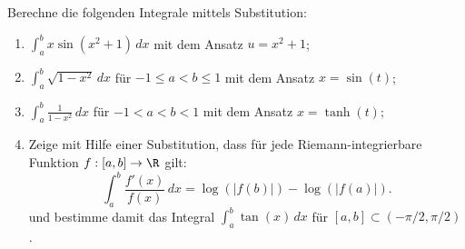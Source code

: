 \begin{prob}
Berechne die folgenden Integrale mittels Substitution:
\begin{enumerate}[label=(\alph*)]
\item $\int_a^b x\sin(x^2+1)\,dx$ mit dem Ansatz $u=x^2+1$;
\item $\int_a^b \sqrt{1-x^2}\,dx$ f\"ur $-1\leq a<b\leq1$ mit dem Ansatz $x=\sin(t)$;
\item $\int_a^b\frac{1}{1-x^2}\,dx$ f\"ur $-1<a<b<1$ mit dem Ansatz $x=\tanh(t)$;
\item Zeige mit Hilfe einer Substitution, dass für jede Riemann-integrierbare Funktion $f:[a,b]\to\R$ gilt:
$$
\int_a^b\frac{f'(x)}{f(x)}\,dx = \log(|f(b)|)- \log(|f(a)|).
$$
 und bestimme damit das Integral $\int_a^b\tan(x)\,dx$ für $[a,b]\subset(-\pi/2,\pi/2)$.
\end{enumerate} 
\end{prob}
